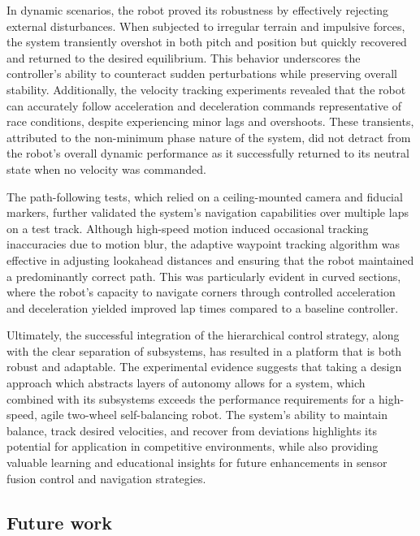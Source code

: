     In dynamic scenarios, the robot proved its robustness by effectively rejecting external disturbances.
    When subjected to irregular terrain and impulsive forces, the system transiently overshot in both pitch and position but quickly recovered 
    and returned to the desired equilibrium. This behavior underscores the controller's ability to counteract sudden perturbations
    while preserving overall stability. Additionally, the velocity tracking experiments revealed that the robot can accurately follow acceleration and 
    deceleration commands representative of race conditions, despite experiencing minor lags and overshoots. 
    These transients, attributed to the non-minimum phase nature of the system, did not detract from the robot's overall dynamic performance as it successfully returned 
    to its neutral state when no velocity was commanded.

    The path-following tests, which relied on a ceiling-mounted camera and fiducial markers, further validated the system's navigation capabilities over multiple 
    laps on a test track. Although high-speed motion induced occasional tracking inaccuracies due to motion blur, the adaptive waypoint tracking algorithm was effective
    in adjusting lookahead distances and ensuring that the robot maintained a predominantly correct path. This was particularly evident in curved sections, 
    where the robot's capacity to navigate corners through controlled acceleration and deceleration yielded improved lap times compared to a baseline controller.

    Ultimately, the successful integration of the hierarchical control strategy, along with the clear separation of subsystems, has resulted in a platform that is 
    both robust and adaptable. The experimental evidence suggests that taking a design approach which abstracts layers of autonomy allows for a system, which combined with its subsystems
    exceeds the performance requirements for a high-speed, agile two-wheel self-balancing robot. The system's ability to maintain balance, track desired velocities, 
    and recover from deviations highlights its potential for application in competitive environments, while also providing valuable learning and educational insights 
    for future enhancements in sensor fusion control and navigation strategies.
    \subsection{Future work}

